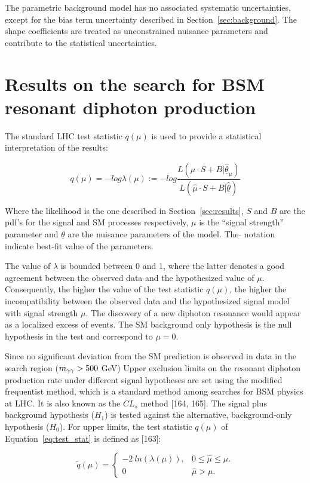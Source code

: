 The parametric background model has no associated systematic uncertainties, except for the
bias term uncertainty described in Section~\ref{sec:background}.
The shape coefficients are treated as unconstrained nuisance parameters and contribute to
the statistical uncertainties.

\clearpage
\section{Results on the search for BSM resonant diphoton production}
The standard LHC test statistic $q(\mu)$ is used to provide a statistical interpretation of the results:

\begin{equation}
 q(\mu) = -log \lambda(\mu) := -log \frac{ L(\mu \cdot S + B | \underline{\hat\theta}_{\mu} ) } {L (\hat\mu
  \cdot S + B | \underline{\hat\theta} )}
\end{equation}
\label{eq:test_stat}

Where the likelihood is the one described in Section~\ref{sec:results},
$S$ and $B$ are the pdf's for the signal and SM processes respectively, $\mu$ is
the ``signal strength'' parameter and $\underline\theta$ are the nuisance parameters of
the model. The $\hat{}$ notation indicate best-fit value of the parameters.

The value of $\lambda$ is bounded between 0 and 1, where the latter denotes a good agreement between the
observed data and the hypothesized value of $\mu$. Consequently, the higher the value of
the test statistic $q(\mu)$, the higher the incompatibility between the observed data and the
hypothesized signal model with signal strength $\mu$.
The discovery of a new diphoton resonance would appear as a localized excess of events.
The SM background only hypothesis is the null hypothesis in the test and correspond to $\mu = 0$.

Since no significant deviation from the SM prediction is observed in data in the search region ($m_{\gamma\gamma} > 500$ GeV)
Upper exclusion limits on the resonant diphoton production rate under different signal
hypotheses are set using the modified frequentist method, which is a standard method among searches
for BSM physics at LHC. It is also known
as the $CL_s$ method [164, 165]. The signal plus background hypothesis ($H_1$) 
is tested against the alternative, background-only hypothesis ($H_0$). For
upper limits, the test statistic $q(\mu)$ of Equation~\ref{eq:test_stat} is defined as [163]:

\begin{equation}
  \tilde{q}(\mu) = \begin{cases}
    -2~ln(\lambda(\mu)), & 0 \leq \hat\mu \leq \mu. \\
    0 & \hat\mu > \mu.
  \end{cases}
\end{equation}  

